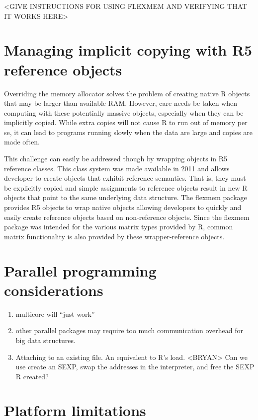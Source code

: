 <GIVE INSTRUCTIONS FOR USING FLEXMEM AND VERIFYING THAT IT WORKS HERE>

\section{Managing implicit copying with R5 reference objects}

Overriding the memory allocator solves the problem of creating native
R objects that may be larger than available RAM. However, care needs
be taken when computing with these potentially massive objects, 
especially when they can be implicitly copied. While extra copies will
not cause R to run out of memory per se, it can lead to programs running
slowly when the data are large and copies are made often.

This challenge can easily be addressed though by wrapping objects in 
R5 reference classes. This class system was made available in 2011 and
allows developer to create objects that exhibit reference semantics.
That is, they must be explicitly copied and simple assignments to 
reference objects result in new R objects that point to the same 
underlying data structure. The flexmem package provides R5 objects 
to wrap native objects allowing developers to quickly and easily create
reference objects based on non-reference objects. Since the flexmem package
was intended for the various matrix types provided by R, common matrix
functionality is also provided by these wrapper-reference objects.

\section{Parallel programming considerations}

\begin{enumerate}
\item multicore will ``just work''
\item other parallel packages may require too much communication overhead
for big data structures.
\item Attaching to an existing file. An equivalent to R's load.
<BRYAN> Can we use create an SEXP, swap the addresses in the interpreter,
and free the SEXP R created?
\end{enumerate}

\section{Platform limitations}

